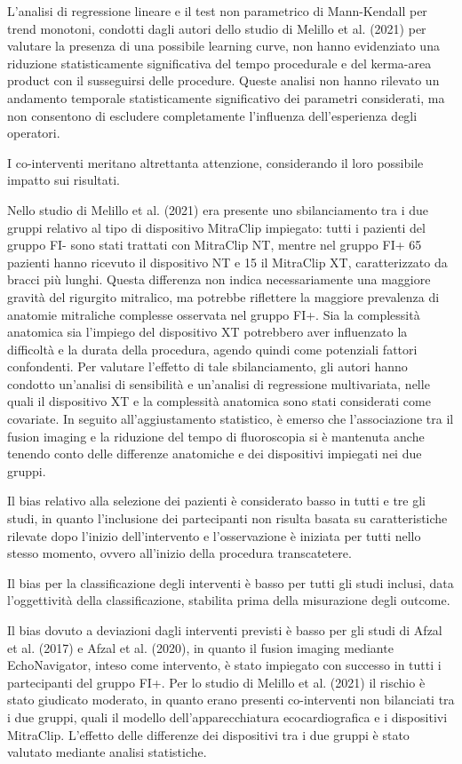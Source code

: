 \documentclass[12pt,a4paper,twoside]{article}
\begin{document}
L'analisi di regressione lineare e il test non parametrico di Mann-Kendall per trend monotoni, condotti dagli autori dello studio di Melillo et al. (2021) per valutare la presenza di una possibile learning curve, non hanno evidenziato una riduzione statisticamente significativa del tempo procedurale e del kerma-area product con il susseguirsi delle procedure. Queste analisi non hanno rilevato un andamento temporale statisticamente significativo dei parametri considerati, ma non consentono di escludere completamente l'influenza dell'esperienza degli operatori. \cite{ref26}

I co-interventi meritano altrettanta attenzione, considerando il loro possibile impatto sui risultati.

Nello studio di Melillo et al. (2021) era presente uno sbilanciamento tra i due gruppi relativo al tipo di dispositivo MitraClip impiegato: tutti i pazienti del gruppo FI- sono stati trattati con MitraClip NT, mentre nel gruppo FI+ 65 pazienti hanno ricevuto il dispositivo NT e 15 il MitraClip XT, caratterizzato da bracci più lunghi. Questa differenza non indica necessariamente una maggiore gravità del rigurgito mitralico, ma potrebbe riflettere la maggiore prevalenza di anatomie mitraliche complesse osservata nel gruppo FI+. Sia la complessità anatomica sia l'impiego del dispositivo XT potrebbero aver influenzato la difficoltà e la durata della procedura, agendo quindi come potenziali fattori confondenti. Per valutare l'effetto di tale sbilanciamento, gli autori hanno condotto un'analisi di sensibilità e un'analisi di regressione multivariata, nelle quali il dispositivo XT e la complessità anatomica sono stati considerati come covariate. In seguito all'aggiustamento statistico, è emerso che l'associazione tra il fusion imaging e la riduzione del tempo di fluoroscopia si è mantenuta anche tenendo conto delle differenze anatomiche e dei dispositivi impiegati nei due gruppi. \cite{ref26}

Il bias relativo alla selezione dei pazienti è considerato basso in tutti e tre gli studi, in quanto l'inclusione dei partecipanti non risulta basata su caratteristiche rilevate dopo l'inizio dell'intervento e l'osservazione è iniziata per tutti nello stesso momento, ovvero all'inizio della procedura transcatetere.

Il bias per la classificazione degli interventi è basso per tutti gli studi inclusi, data l'oggettività della classificazione, stabilita prima della misurazione degli outcome.

Il bias dovuto a deviazioni dagli interventi previsti è basso per gli studi di Afzal et al. (2017) e Afzal et al. (2020), in quanto il fusion imaging mediante EchoNavigator, inteso come intervento, è stato impiegato con successo in tutti i partecipanti del gruppo FI+. Per lo studio di Melillo et al. (2021) il rischio è stato giudicato moderato, in quanto erano presenti co-interventi non bilanciati tra i due gruppi, quali il modello dell'apparecchiatura ecocardiografica e i dispositivi MitraClip. L'effetto delle differenze dei dispositivi tra i due gruppi è stato valutato mediante analisi statistiche.
\end{document}
